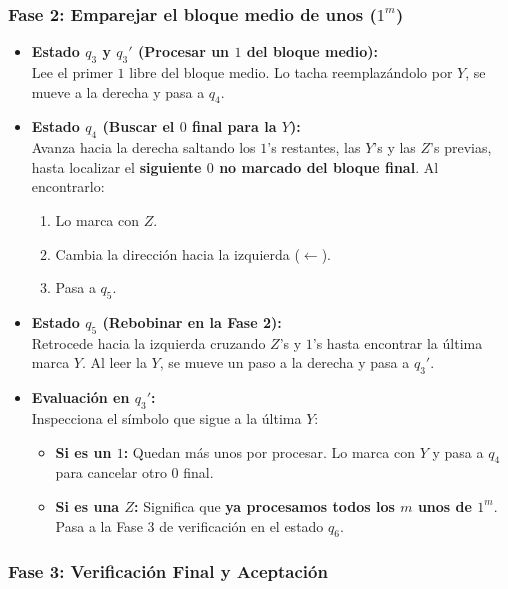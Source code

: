 \subsubsection*{Fase 2: Emparejar el bloque medio de unos ($1^m$)}

\begin{itemize}[leftmargin=*]
    \item \textbf{Estado $q_3$ y $q_3'$ (Procesar un $1$ del bloque medio):}\\
    Lee el primer $1$ libre del bloque medio. Lo tacha reemplazándolo por $Y$, se mueve a la derecha y pasa a $q_4$.

    \item \textbf{Estado $q_4$ (Buscar el $0$ final para la $Y$):}\\
    Avanza hacia la derecha saltando los $1$'s restantes, las $Y$'s y las $Z$'s previas, hasta localizar el \textbf{siguiente $0$ no marcado del bloque final}. Al encontrarlo:
    \begin{enumerate}[label=\arabic*., leftmargin=*]
        \item Lo marca con $Z$.
        \item Cambia la dirección hacia la izquierda ($\leftarrow$).
        \item Pasa a $q_5$.
    \end{enumerate}

    \item \textbf{Estado $q_5$ (Rebobinar en la Fase 2):}\\
    Retrocede hacia la izquierda cruzando $Z$'s y $1$'s hasta encontrar la última marca $Y$. Al leer la $Y$, se mueve un paso a la derecha y pasa a $q_3'$.

    \item \textbf{Evaluación en $q_3'$:}\\
    Inspecciona el símbolo que sigue a la última $Y$:
    \begin{itemize}[leftmargin=*]
        \item \textbf{Si es un $1$:} Quedan más unos por procesar. Lo marca con $Y$ y pasa a $q_4$ para cancelar otro $0$ final.
        \item \textbf{Si es una $Z$:} Significa que \textbf{ya procesamos todos los $m$ unos de $1^m$}. Pasa a la Fase 3 de verificación en el estado $q_6$.
    \end{itemize}
\end{itemize}

\subsubsection*{Fase 3: Verificación Final y Aceptación}

